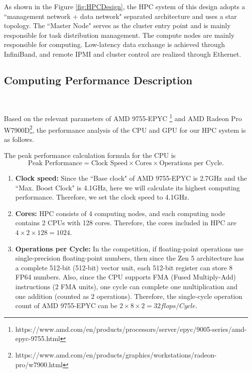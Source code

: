As shown in the Figure \ref{fig:HPCDesign}, the HPC system of this design adopts a ``management network + data network" separated architecture and uses a star topology. 
The ``Master Node" serves as the cluster entry point and is mainly responsible for task distribution management. 
The compute nodes are mainly responsible for computing. 
Low-latency data exchange is achieved through InfiniBand, and remote IPMI and cluster control are realized through Ethernet.

\subsection{Computing Performance Description}
\

Based on the relevant parameters of AMD 9755-EPYC \footnote{https://www.amd.com/en/products/processors/server/epyc/9005-series/amd-epyc-9755.html}
and AMD Radeon Pro W7900D\footnote{https://www.amd.com/en/products/graphics/workstations/radeon-pro/w7900.html}, the performance analysis of the CPU and GPU for our HPC system is as follows.

The peak performance calculation formula for the CPU is 
\begin{equation}
         \text{Peak Performance} = \text{Clock Speed} \times \text{Cores} \times \text{Operations per Cycle}.
\end{equation}

\begin{enumerate}
    \item \textbf{Clock speed: }Since the ``Base clock" of AMD 9755-EPYC is 2.7GHz and the ``Max. Boost Clock" is 4.1GHz, here we will calculate its highest computing performance. 
    Therefore, we set the clock speed to 4.1GHz.
    \item \textbf{Cores: }HPC consists of 4 computing nodes, and each computing node contains 2 CPUs with 128 cores. 
    Therefore, the cores included in HPC are $4{\times}2{\times}128{=}1024$.
    \item \textbf{Operations per Cycle: }In the competition, if floating-point operations use single-precision floating-point numbers, then since the Zen 5 architecture has a complete 512-bit (512-bit) vector unit, each 512-bit register can store 8 FP64 numbers. 
    Also, since the CPU supports FMA (Fused Multiply-Add) instructions (2 FMA units), one cycle can complete one multiplication and one addition (counted as 2 operations). 
    Therefore, the single-cycle operation count of AMD 9755-EPYC can be $2{\times}8{\times}2{=}32 flops/Cycle$.
\end{enumerate}  

